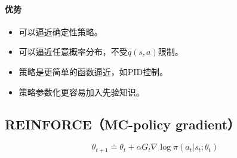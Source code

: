 \documentclass[
12pt, %
a4paper, 
oneside, %
headinclude,footinclude, %
]{scrartcl}
\begin{document}
\paragraph{优势}
\begin{itemize}
\item 可以逼近确定性策略。
\item 可以逼近任意概率分布，不受$ q(s, a) $限制。
\item 策略是更简单的函数逼近，如PID控制。
\item 策略参数化更容易加入先验知识。
\end{itemize}
\subsection[REINFORCE]{REINFORCE（MC-policy gradient）}
$$ \theta_{t + 1} \doteq \theta_t + \alpha G_t \nabla\log \pi (a_t|s_t; \theta_t) $$
\end{document}

